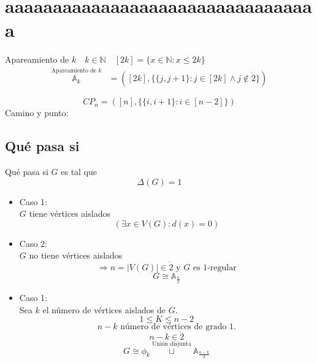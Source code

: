 \documentclass[../main.tex]{subfiles}
\begin{document}
\chapter{aaaaaaaaaaaaaaaaaaaaaaaaaaaaaaaaa}%

\thispagestyle{fancy}

Apareamiento de $k\quad k\in \mathbb{N}\quad [2k]=\{x\in\mathbb{N}:x\leq 2k\}$
\begin{align*}
	\overset
	{
		\text{Apareamiento de $k$}
	}
	{
		\mathbb{A}_k
	}
	&=
	(
		[2k],
		\{
			\{j,j+1\}:
			j\in [2k] \wedge j \notin \dot{2}
		\}
	)
\end{align*}

\begin{figure}[H]
	\centering
	
\end{figure}

\begin{figure}[H]
	\centering
	
\end{figure}

\[
	CP_n =
	(
		[n],
		\{
			\{i,i+1\}:
			i \in[n-2]
		\}
	)
\]
Camino y punto:

\begin{figure}[H]
	\centering
	
\end{figure}

\section{Qué pasa si}%
\label{sec:que_pasa_si}

Qué pasa si $G$ es tal que
\[\Delta(G)=1\]
\begin{itemize}
	\item Caso 1:\\
		$G$ tiene vértices aislados
		\[
			(\exists x \in V(G):d(x)=0)
		\]
	\item Caso 2:\\
		$G$ no tiene vértices aislados
		\[
			\Rightarrow n = |V(G)|\in\dot{2}
			\text{ y $G$ es 1-regular}
		\]
		\[
			G \cong \mathbb{A}_{\frac{n}{2}}
		\]
\end{itemize}

\begin{itemize}
	\item Caso 1:\\
		Sea $k$ el número de vértices aislados de $G$.
		\[
			1 \leq K \leq n-2
		\]
		\[
			n-k \text{  número de vértices de grado 1.}
		\]
		\[
			n-k \in \dot{2}
		\]
		\[
			G \cong \phi_k
			\overset
			{
				\text{Unión disjunta}
			}
			{
				\sqcup
			}
			\mathbb{A}_{\frac{n-k}{2}}
		\]
\end{itemize}
\end{document}
